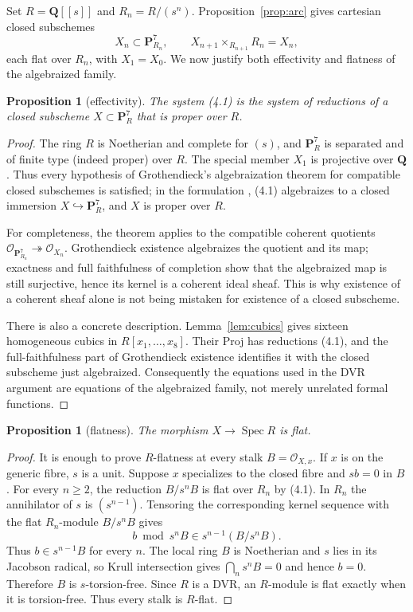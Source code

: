 \documentclass[11pt]{article}
\newtheorem{proposition}[theorem]{Proposition}
\theoremstyle{definition}
\theoremstyle{remark}
\newcommand{\QQ}{\mathbf Q}
\newcommand{\PP}{\mathbf P}
\newcommand{\Spec}{\operatorname{Spec}}
\begin{document}
Set $R=\QQ[[s]]$ and $R_n=R/(s^n)$.  Proposition~\ref{prop:arc} gives
cartesian closed subschemes
\[
 X_n\subset\PP^7_{R_n},\qquad X_{n+1}\times_{R_{n+1}}R_n=X_n, \tag{4.1}
\]
each flat over $R_n$, with $X_1=X_0$.  We now justify both effectivity and
flatness of the algebraized family.

\begin{proposition}[effectivity]\label{prop:effectivity}
The system (4.1) is the system of reductions of a closed subscheme
$X\subset\PP^7_R$ that is proper over $R$.
\end{proposition}

\begin{proof}
The ring $R$ is Noetherian and complete for $(s)$, and $\PP^7_R$ is separated
and of finite type (indeed proper) over $R$.  The special member $X_1$ is
projective over $\QQ$.  Thus every hypothesis of Grothendieck's algebraization
theorem for compatible closed subschemes is satisfied; in the formulation
\cite[Tag 0899]{Stacks}, (4.1) algebraizes to a closed immersion
$X\hookrightarrow\PP^7_R$, and $X$ is proper over $R$.

For completeness, the theorem applies to the compatible coherent quotients
$\mathcal O_{\PP^7_{R_n}}\twoheadrightarrow\mathcal O_{X_n}$.
Grothendieck existence algebraizes the quotient and its map; exactness and
full faithfulness of completion show that the algebraized map is still
surjective, hence its kernel is a coherent ideal sheaf.  This is why existence
of a coherent sheaf alone is not being mistaken for existence of a closed
subscheme.

There is also a concrete description.  Lemma~\ref{lem:cubics} gives sixteen
homogeneous cubics in $R[x_1,\ldots,x_8]$.  Their Proj has reductions (4.1), and
the full-faithfulness part of Grothendieck existence identifies it with the
closed subscheme just algebraized.  Consequently the equations used in the
DVR argument are equations of the algebraized family, not merely unrelated
formal functions.
\end{proof}

\begin{proposition}[flatness]\label{prop:flat}
The morphism $X\to\Spec R$ is flat.
\end{proposition}

\begin{proof}
It is enough to prove $R$-flatness at every stalk $B=\mathcal O_{X,x}$.
If $x$ is on the generic fibre, $s$ is a unit.  Suppose $x$ specializes to
the closed fibre and $sb=0$ in $B$.  For every $n\ge2$, the reduction
$B/s^nB$ is flat over $R_n$ by (4.1).  In $R_n$ the annihilator of $s$ is
$(s^{n-1})$.  Tensoring the corresponding kernel sequence with the flat
$R_n$-module $B/s^nB$ gives
\[
 b\bmod s^nB\in s^{n-1}(B/s^nB).
\]
Thus $b\in s^{n-1}B$ for every $n$.  The local ring $B$ is Noetherian and
$s$ lies in its Jacobson radical, so Krull intersection gives
$\bigcap_ns^nB=0$ and hence $b=0$.  Therefore $B$ is $s$-torsion-free.
Since $R$ is a DVR, an $R$-module is flat exactly when it is torsion-free.
Thus every stalk is $R$-flat.
\end{proof}
\end{document}
